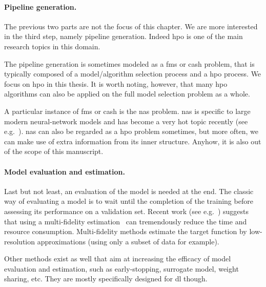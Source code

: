\paragraph{Pipeline generation.} 
The previous two parts are not the focus of this chapter. We are more interested in the third step, namely pipeline generation. Indeed \gls{hpo} is one of the main research topics in this domain.

The pipeline generation is sometimes modeled as a \gls{fms} or \gls{cash} problem, that is typically composed of a model/algorithm selection process and a \gls{hpo} process. We focus on \gls{hpo} in this thesis. It is worth noting, however, that many \gls{hpo} algorithms can also be applied on the full model selection problem as a whole.

A particular instance of \gls{fms} or \gls{cash} is the \gls{nas} problem. \gls{nas} is specific to large modern neural-network models and has become a very hot topic recently (see e.g.~\citealt{elsken2019nas,zoph2018nas,kandasamy2018nas,liu2019darts}). \gls{nas} can also be regarded as a \gls{hpo} problem sometimes, but more often, we can make use of extra information from its inner structure. Anyhow, it is also out of the scope of this manuscript.

\paragraph{Model evaluation and estimation.}
Last but not least, an evaluation of the model is needed at the end. The classic way of evaluating a model is to wait until the completion of the training before assessing its performance on a validation set. Recent work (see e.g.~\citealt{li2017hyperband}) suggests that using a multi-fidelity estimation~\citep{huang2006multifidelity,wu2019multi-fidelity,peherstorfer2018multifidelity} can tremendously reduce the time and resource consumption. Multi-fidelity methods estimate the target function by low-resolution approximations (using only a subset of data for example).

Other methods exist as well that aim at increasing the efficacy of model evaluation and estimation, such as early-stopping, surrogate model, weight sharing, etc. They are mostly specifically designed for \gls{dl} though.
    

